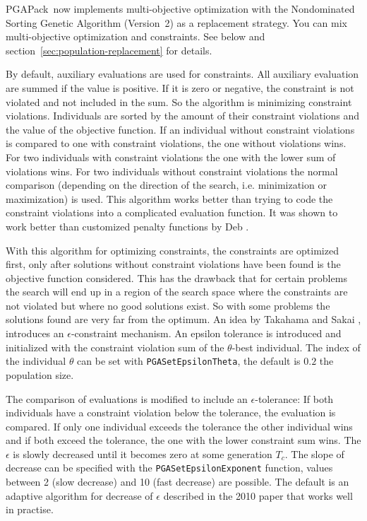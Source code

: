 \documentclass{report}
\newcommand{\pga}{PGAPack}
\begin{document}
\pga\ now implements multi-objective optimization with the Nondominated
Sorting Genetic Algorithm (Version~2) \cite{DPAM02} as a replacement
strategy. You can mix multi-objective optimization and constraints.
See below and section~\ref{sec:population-replacement} for details.

By default, auxiliary evaluations are used for constraints. All
auxiliary evaluation are summed if the value is positive. If it is zero
or negative, the constraint is not violated and not included in the sum.
So the algorithm is
minimizing constraint violations.  Individuals are sorted by the amount
of their constraint violations and the value of the objective function.
If an individual without constraint violations is compared to one with
constraint violations, the one without violations wins. For two
individuals with constraint violations the one with the lower sum of
violations wins. For two individuals without constraint violations the
normal comparison (depending on the direction of the search, i.e.
minimization or maximization) is used. This algorithm works better than
trying to code the constraint violations into a complicated evaluation
function. It was shown to work better than customized penalty functions
by Deb \cite{Deb00}.

With this algorithm for optimizing constraints, the constraints are
optimized first, only after solutions without constraint violations have
been found is the objective function considered. This has the drawback
that for certain problems the search will end up in a region of the
search space where the constraints are not violated but where no good
solutions exist. So with some problems the solutions found are very far
from the optimum. An idea by Takahama and Sakai \cite{TS10}, \cite{TS06}
introduces an $\epsilon$-constraint mechanism. An epsilon tolerance is
introduced and initialized with the constraint violation sum of the
$\theta$-best individual. The index of the individual $\theta$ can be
set with \verb+PGASetEpsilonTheta+, the default is $0.2$ the population
size.

The comparison of evaluations is modified to include an
$\epsilon$-tolerance: If both individuals have a constraint violation
below the tolerance, the evaluation is compared. If only one
individual exceeds the tolerance the other individual wins and if both
exceed the tolerance, the one with the lower constraint sum wins. The
$\epsilon$ is slowly decreased until it becomes zero at some generation
$T_c$. The slope of decrease can be specified with the
\verb+PGASetEpsilonExponent+ function, values between 2 (slow decrease)
and 10 (fast decrease) are possible. The default is an adaptive
algorithm for decrease of $\epsilon$ described in the 2010 paper \cite{TS06}
that works well in practise.
\end{document}
